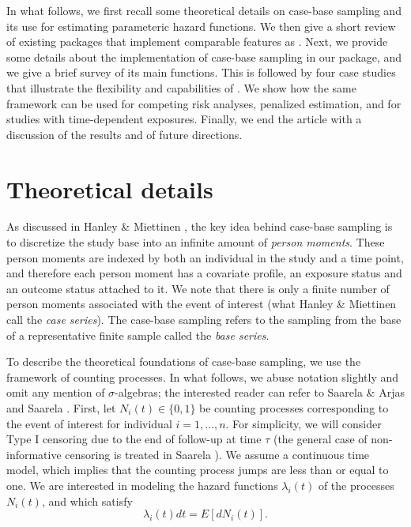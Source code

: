 \documentclass[
]{jss}
\begin{document}
In what follows, we first recall some theoretical details on case-base
sampling and its use for estimating parameteric hazard functions. We
then give a short review of existing  packages that
implement comparable features as . Next, we provide some
details about the implementation of case-base sampling in our package,
and we give a brief survey of its main functions. This is followed by
four case studies that illustrate the flexibility and capabilities of
. We show how the same framework can be used for competing
risk analyses, penalized estimation, and for studies with time-dependent
exposures. Finally, we end the article with a discussion of the results
and of future directions.

\hypertarget{theoretical-details}{%
\section{Theoretical details}\label{theoretical-details}}

As discussed in Hanley \& Miettinen \citeyearpar{hanley2009fitting}, the
key idea behind case-base sampling is to discretize the study base into
an infinite amount of \emph{person moments}. These person moments are
indexed by both an individual in the study and a time point, and
therefore each person moment has a covariate profile, an exposure status
and an outcome status attached to it. We note that there is only a
finite number of person moments associated with the event of interest
(what Hanley \& Miettinen call the \emph{case series}). The case-base
sampling refers to the sampling from the base of a representative finite
sample called the \emph{base series}.

To describe the theoretical foundations of case-base sampling, we use
the framework of counting processes. In what follows, we abuse notation
slightly and omit any mention of \(\sigma\)-algebras; the interested
reader can refer to Saarela \& Arjas \citeyearpar{saarela2015non} and
Saarela \citeyearpar{saarela2016case}. First, let
\(N_{i}(t) \in \{0, 1\}\) be counting processes corresponding to the
event of interest for individual \(i=1, \ldots,n\). For simplicity, we
will consider Type I censoring due to the end of follow-up at time
\(\tau\) (the general case of non-informative censoring is treated in
Saarela \citeyearpar{saarela2016case}). We assume a continuous time
model, which implies that the counting process jumps are less than or
equal to one. We are interested in modeling the hazard functions
\(\lambda_{i}(t)\) of the processes \(N_i(t)\), and which satisfy
\[\lambda_{i}(t) dt = E[dN_{i}(t)].\]
\end{document}
